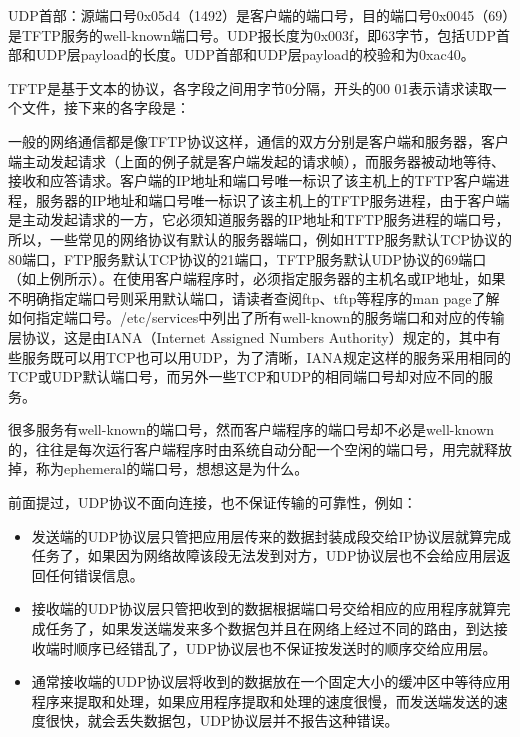UDP首部：源端口号0x05d4（1492）是客户端的端口号，目的端口号0x0045（69）是TFTP服务的well-known端口号。UDP报长度为0x003f，即63字节，包括UDP首部和UDP层payload的长度。UDP首部和UDP层payload的校验和为0xac40。



TFTP是基于文本的协议，各字段之间用字节0分隔，开头的00 01表示请求读取一个文件，接下来的各字段是：


\begin{BookLiteral}
\end{BookLiteral}


一般的网络通信都是像TFTP协议这样，通信的双方分别是客户端和服务器，客户端主动发起请求（上面的例子就是客户端发起的请求帧），而服务器被动地等待、接收和应答请求。客户端的IP地址和端口号唯一标识了该主机上的TFTP客户端进程，服务器的IP地址和端口号唯一标识了该主机上的TFTP服务进程，由于客户端是主动发起请求的一方，它必须知道服务器的IP地址和TFTP服务进程的端口号，所以，一些常见的网络协议有默认的服务器端口，例如HTTP服务默认TCP协议的80端口，FTP服务默认TCP协议的21端口，TFTP服务默认UDP协议的69端口（如上例所示）。在使用客户端程序时，必须指定服务器的主机名或IP地址，如果不明确指定端口号则采用默认端口，请读者查阅ftp、tftp等程序的man page了解如何指定端口号。/etc/\BookSplit{}services中列出了所有well-known的服务端口和对应的传输层协议，这是由IANA（Internet Assigned Numbers Authority）规定的，其中有些服务既可以用TCP也可以用UDP，为了清晰，IANA规定这样的服务采用相同的TCP或UDP默认端口号，而另外一些TCP和UDP的相同端口号却对应不同的服务。



很多服务有well-known的端口号，然而客户端程序的端口号却不必是well-known的，往往是每次运行客户端程序时由系统自动分配一个空闲的端口号，用完就释放掉，称为ephemeral的端口号，想想这是为什么。



前面提过，UDP协议不面向连接，也不保证传输的可靠性，例如：


\begin{itemize}

\item 发送端的UDP协议层只管把应用层传来的数据封装成段交给IP协议层就算完成任务了，如果因为网络故障该段无法发到对方，UDP协议层也不会给应用层返回任何错误信息。

\item 接收端的UDP协议层只管把收到的数据根据端口号交给相应的应用程序就算完成任务了，如果发送端发来多个数据包并且在网络上经过不同的路由，到达接收端时顺序已经错乱了，UDP协议层也不保证按发送时的顺序交给应用层。

\item 通常接收端的UDP协议层将收到的数据放在一个固定大小的缓冲区中等待应用程序来提取和处理，如果应用程序提取和处理的速度很慢，而发送端发送的速度很快，就会丢失数据包，UDP协议层并不报告这种错误。
\end{itemize}


